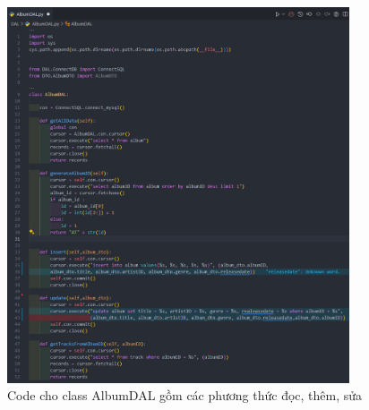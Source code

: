 \documentclass[a4paper]{article}
\begin{document}
\clearpage
\newpage
\begin{figure}[h]
	\centering
	\includegraphics[width=0.9\textwidth]{images/albumDAL.png}
	\caption{Code cho class AlbumDAL gồm các phương thức đọc, thêm, sửa}
\end{figure}
\end{document}
